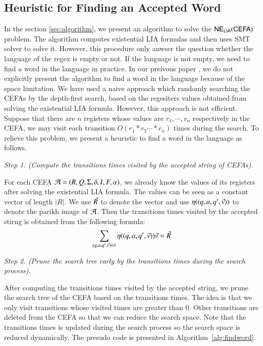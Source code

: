 \subsection{Heuristic for Finding an Accepted Word}
In the section \ref{sec:algorithm}, we present an algorithm to solve the ${\sf NE_{LIA}(CEFA)}$ problem. The algorithm computes existential LIA formulas and then uses SMT solver to solve it. However, this procedure only anwser the question whether the language of the regex is empty or not. If the language is not empty, we need to find a word in the language in practice. In our preivous paper \cite{Denghang2023}, we do not explicitly present the algorithm to find a word in the language because of the space limitation. We have used a naive approach which randomly searching the CEFAs by the depth-first search, based on the regesiters values obtained from solving the existential LIA formula. However, this approach is not efficient. Suppose that there are $n$ registers whose values are $r_1,\cdots, r_n$ respectively in the CEFA, we may visit each transition $O(r_1*r_2\cdots *r_n)$ times during the search. To relieve this problem, we present a heuristic to find a word in the language as follows.

\medskip
\noindent
\emph{Step 1. (Compute the transitions times visited by the accepted string of CEFAs).}

For each CEFA $\mathcal{A} = (R, Q, \Sigma, \delta, I, F, \alpha)$, we already know the values of its registers after solving the existential LIA formula. The values can be seen as a constant vector of length $|R|$. We use $\vec{R}$ to denote the vector and use $\eta((q, a, q', \vec{v}))$ to denote the parikh image of $\mathcal{A}$. Then the transitions times visited by the accepted stirng is obtained from the following formula:
$$ \sum \limits_{(q, a, q', \vec{v})\in \delta} \eta((q, a, q', \vec{v}))\vec{v} = \vec{R}$$

\medskip
\noindent
\emph{Step 2. (Prune the search tree early by the transitions times during the search process).}

After computing the transitions times visited by the accepted string, we prune the search tree of the CEFA based on the transitions times. The idea is that we only visit transitions whose visited times are greater than $0$. Other transitions are deleted from the CEFA so that we can reduce the search space. Note that the transitions times is updated during the search process so the search space is reduced dynamically. The presudo code is presented in Algorithm~\ref{alg:findword}.

